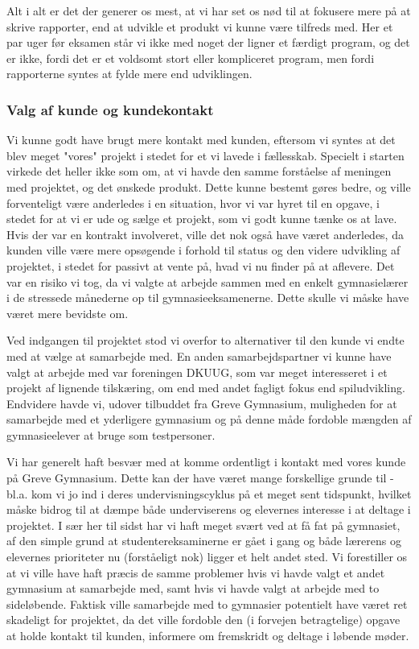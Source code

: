 \documentclass[10pt,a4paper,danish]{article}
\begin{document}
Alt i alt er det der generer os mest, at vi har set os nød til at fokusere mere
på at skrive rapporter, end at udvikle et produkt vi kunne være tilfreds med.
Her et par uger før eksamen står vi ikke med noget der ligner et færdigt program,
og det er ikke, fordi det er et voldsomt stort eller kompliceret program, men
fordi rapporterne syntes at fylde mere end udviklingen. 

\subsubsection{Valg af kunde og kundekontakt}
Vi kunne godt have brugt mere kontakt med kunden, eftersom vi syntes at det blev meget "vores" projekt
i stedet for et vi lavede i fællesskab. Specielt i starten virkede det heller ikke som om, at vi 
havde den samme forståelse af meningen med projektet, og det ønskede produkt.
Dette kunne bestemt gøres bedre, og ville forventeligt være anderledes i en
situation, hvor vi var hyret til en opgave, i stedet for at vi er ude og sælge
et projekt, som vi godt kunne tænke os at lave. Hvis der var en kontrakt involveret, ville det nok også have været anderledes, da kunden ville være mere 
opsøgende i forhold til status og den videre udvikling af projektet, i stedet
for passivt at vente på, hvad vi nu finder på at aflevere. Det var en risiko vi
tog, da vi valgte at arbejde sammen med en enkelt gymnasielærer i de stressede
månederne op til gymnasieeksamenerne. Dette skulle vi måske have været mere
bevidste om. 

Ved indgangen til projektet stod vi overfor to alternativer til den kunde vi endte med
at vælge at samarbejde med. En anden samarbejdspartner vi kunne have valgt at arbejde med
var foreningen DKUUG, som var meget interesseret i et projekt af lignende tilskæring, om end
med andet fagligt fokus end spiludvikling. Endvidere havde vi, udover tilbuddet fra Greve
Gymnasium, muligheden for at samarbejde med et yderligere gymnasium og på denne måde fordoble
mængden af gymnasieelever at bruge som testpersoner. 

Vi har generelt haft besvær med at komme ordentligt i kontakt med vores kunde på Greve Gymnasium. 
Dette kan der have været mange forskellige grunde til - bl.a. kom vi jo ind i deres undervisningscyklus
på et meget sent tidspunkt, hvilket måske bidrog til at dæmpe både underviserens og elevernes 
interesse i at deltage i projektet. I sær her til sidst har vi haft meget svært ved at få fat
på gymnasiet, af den simple grund at studentereksaminerne er gået i gang og både lærerens og
elevernes prioriteter nu (forståeligt nok) ligger et helt andet sted. Vi forestiller os at vi ville
have haft præcis de samme problemer hvis vi havde valgt et andet gymnasium at samarbejde med, samt 
hvis vi havde valgt at arbejde med to sideløbende. Faktisk ville samarbejde med to gymnasier potentielt
have været ret skadeligt for projektet, da det ville fordoble den (i forvejen betragtelige) opgave 
at holde kontakt til kunden, informere om fremskridt og deltage i løbende møder. 
\end{document}
